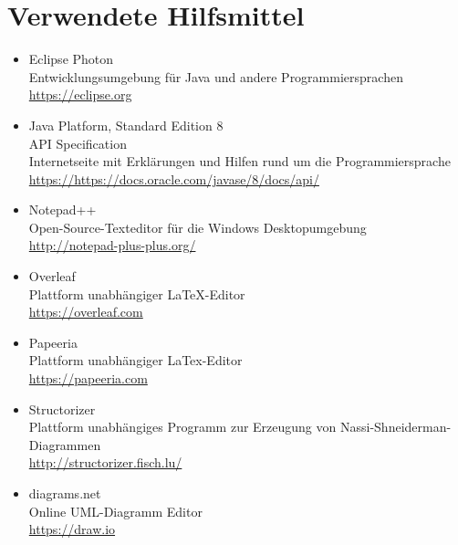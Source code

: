 \chapter{Verwendete Hilfsmittel}
\label{Hilfsmittel}

\begin{itemize}
		\item Eclipse Photon\\ Entwicklungsumgebung f\"ur Java und andere Programmiersprachen \\\url{https://eclipse.org}
		\item Java Platform, Standard Edition 8\\API Specification\\ Internetseite mit Erklärungen und Hilfen rund um die Programmiersprache \\\url{https://https://docs.oracle.com/javase/8/docs/api/}
		\item Notepad++\\ Open-Source-Texteditor für die Windows Desktopumgebung\\\url{http://notepad-plus-plus.org/}
		\item Overleaf\\Plattform unabhängiger LaTeX-Editor \\\url{https://overleaf.com}
		\item Papeeria\\Plattform unabhängiger LaTex-Editor \\\url{https://papeeria.com}
		\item Structorizer \\Plattform unabhängiges Programm zur Erzeugung von Nassi-Shneiderman-Diagrammen \\\url{http://structorizer.fisch.lu/}
		\item diagrams.net \\Online UML-Diagramm Editor \\\url{https://draw.io}
	\end{itemize}
\cleardoublepage